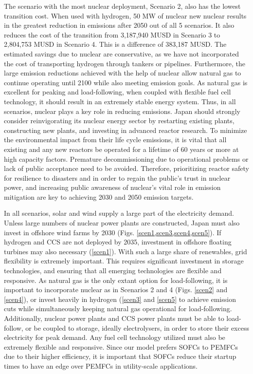 The scenario with the most nuclear deployment, Scenario 2, also has the lowest transition cost. When used with hydrogen, 50 MW of nuclear new nuclear results in the greatest reduction in emissions after 2050 out of all 5 scenarios. It also reduces the cost of the transition from 3,187,940 MUSD in Scenario 3 to 2,804,753 MUSD in Scenario 4. This is a difference of 383,187 MUSD. The estimated savings due to nuclear are conservative, as we have not incorporated the cost of transporting hydrogen through tankers or pipelines. Furthermore, the large emission reductions achieved with the help of nuclear allow natural gas to continue operating until 2100 while also meeting emission goals. As natural gas is excellent for peaking and load-following, when coupled with flexible fuel cell technology, it should result in an extremely stable energy system. Thus, in all scenarios, nuclear plays a key role in reducing emissions. Japan should strongly consider reinvigorating its nuclear energy sector by restarting existing plants, constructing new plants, and investing in advanced reactor research. To minimize the environmental impact from their life cycle emissions, it is vital that all existing and any new reactors be operated for a lifetime of 60 years or more at high capacity factors. Premature decommissioning due to operational problems or lack of public acceptance need to be avoided. Therefore, prioritizing reactor safety for resilience to disasters and in order to regain the public's trust in nuclear power, and increasing public awareness of nuclear's vital role in emission mitigation are key to achieving 2030 and 2050 emission targets.

In all scenarios, solar and wind supply a large part of the electricity demand. Unless large numbers of nuclear power plants are constructed, Japan must also invest in offshore wind farms by 2030 (Figs. \ref{scen1,scen3,scen4,scen5}). If hydrogen and CCS are not deployed by 2035, investment in offshore floating turbines may also necessary (\ref{scen1}). With such a large share of renewables, grid flexibility is extremely important. This requires significant investment in storage technologies, and ensuring that all emerging technologies are flexible and responsive. As natural gas is the only extant option for load-following, it is important to incorporate nuclear as in Scenarios 2 and 4 (Figs. \ref{scen2} and \ref{scen4}), or invest heavily in hydrogen (\ref{scen3} and \ref{scen5} to achieve emission cuts while simultaneously keeping natural gas operational for load-following. Additionally, nuclear power plants and CCS power plants must be able to load-follow, or be coupled to storage, ideally electrolysers, in order to store their excess electricity for peak demand. Any fuel cell technology utilized must also be extremely flexible and responsive. Since our model prefers \gls{SOFC}s to \gls{PEMFC}s due to their higher efficiency, it is important that \gls{SOFC}s reduce their startup times to have an edge over \gls{PEMFC}s in utility-scale applications.


